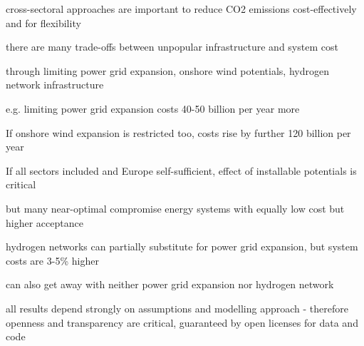cross-sectoral approaches are important to reduce CO2 emissions cost-effectively and for flexibility

there are many trade-offs between unpopular infrastructure and system cost

through limiting power grid expansion, onshore wind potentials, hydrogen network infrastructure

e.g. limiting power grid expansion costs 40-50 billion per year more

If onshore wind expansion is restricted too, costs rise by further 120 billion per year

If all sectors included and Europe self-sufficient, effect of installable potentials is critical

but many near-optimal compromise energy systems with equally low cost but higher acceptance

hydrogen networks can partially substitute for power grid expansion, but system costs are
3-5\% higher

can also get away with neither power grid expansion nor hydrogen network

all results depend strongly on assumptions and modelling approach
- therefore openness and transparency are critical, guaranteed by open licenses for data and code